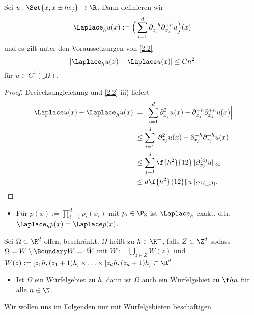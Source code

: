 \begin{kor} \label{2.3}
	Sei $u : \Set{x, x \pm h e_j} \to \R$.
	Dann definieren wir
	\begin{equation} \label{eq:2.1}
		\Laplace_h u(x) :=
		\Big(\sum_{i=1}^d \partial_{x_j}^{-h} \partial_{x_j}^{+h} u \Big) (x)
	\end{equation}
	und es gilt unter den Voraussetzungen von \ref{2.2}
	\[
		|\Laplace_h u(x) - \Laplace u(x)| \le C h^2
	\]
	für $u \in C^4(\_\Omega)$.
	\begin{proof}
		Dreiecksungleichung und \ref{2.2} iii) liefert
		\begin{align*}
			|\Laplace u(x) - \Laplace_h u(x)|
			&= \Big| \sum_{i=1}^d \partial_{x_j}^2 u(x) - \partial_{x_j}^{-h} \partial_{x_j}^{+h} u(x) \Big| \\
			&\le \sum_{i=1}^d | \partial_{x_j}^2 u(x) - \partial_{x_j}^{-h} \partial_{x_j}^{+h} u(x) \Big| \\
			&\le \sum_{j=1}^d \f {h^2}{12} \|\partial_{x_j}^{(4)} u\|_\infty \\
			&\le d \f {h^2}{12} \|u\|_{C^4(\_\Omega)}.
		\end{align*}
	\end{proof}
	\begin{note}
		\begin{itemize}
			\item
				Für $p(x) := \prod_{i=1}^d p_i(x_i)$ mit $p_i \in \P_3$ ist $\Laplace_h$ exakt, d.h. $\Laplace_h p(x) = \Laplace p(x)$.
		\end{itemize}
	\end{note}
\end{kor}


\begin{df}[Würfelgebiet] \label{2.4}
	Sei $\Omega \subset \R^d$ offen, beschränkt.
	$\Omega$ heißt  zu $h \in \R^+$, falls $Z \subset \Z^d$ sodass $\Omega = W \setminus \Boundary W =: \mathring W$ mit $W := \bigcup_{z \in Z} W(z)$ und $W(z) := [z_1h , (z_1+1)h] \times \dotsc \times [z_d h, (z_d+1)h] \subset \R^d$.
	\begin{note}
		\begin{itemize}
			\item
				Ist $\Omega$ ein Würfelgebiet zu $h$, dann ist $\Omega$ auch ein Würfelgebiet zu $\f hn$ für alle $n \in \N$.
		\end{itemize}
	\end{note}
\end{df}

Wir wollen uns im Folgenden nur mit Würfelgebieten beschäftigen

